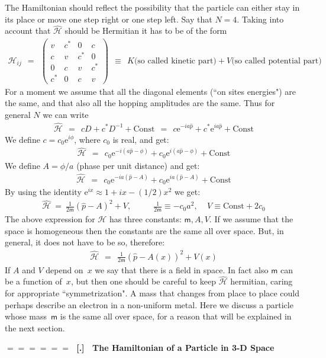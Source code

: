 \documentclass[onecolumn,fleqn]{revtex4}
\newcommand{\eexp}{\mathrm{e}^}
\newcommand{\mass}{\mathsf{m}}
\newcommand{\amatrix}[1]{\begin{matrix} #1 \end{matrix}}
\newcommand{\beq}{\begin{eqnarray}}
\newcommand{\eeq}{\end{eqnarray}}
\renewcommand{\thesubsection}{\arabic{subsection}}
\renewcommand{\thesubsubsection}{\arabic{subsubsection}}
\newcommand{\sheadC}[1]
{
\addtocounter{subsubsection}{1}
\vspace{5mm}
{\Large\bf $=\!=\!=\!=\!=\!=\;$ [\thesubsection.\thesubsubsection] \ #1}  
\nopagebreak
\phantomsection
}
\begin{document}
The Hamiltonian should reflect the possibility that 
the particle can either stay in its place or
move one step right or one step left. Say that $N=4$. 
Taking into account that $\hat{\mathcal{H}}$ should be Hermitian 
it has to be of the form
\beq
\mathcal{H}_{ij} \ \ = \ \ 
\left(\amatrix{
v   & c^* & 0   & c \\ 
c   & v   & c^* & 0 \\
0   & c   & v   & c^* \\
c^* & 0   & c   & v  
}\right)
\ \ \equiv \ \ K\mbox{(so called kinetic part)} + V\mbox{(so called potential part)}
\eeq
For a moment we assume that all the diagonal elements (``on sites energies") are the same, 
and that also all the hopping amplitudes are the same. Thus for general $N$ we can write      
\beq
\hat{\mathcal{H}} 
\ \ = \ \ cD + c^*D^{-1} + \mbox{Const} 
\ \ = \ \ c\mbox{e}^{-ia\hat{p}} + c^* \mbox{e}^{ia\hat{p}} + \mbox{Const} 
\eeq
We define ${c=c_0 \eexp{i\phi}}$, where $c_0$ is real, and get:
\beq
\hat{\mathcal{H}} \ \ = \ \ c_0 \mbox{e}^{-i(a\hat{p}-\phi)} + c_0 \mbox{e}^{i(a\hat{p}-\phi)} + \mbox{Const} 
\eeq
We define ${A= \phi / a}$ (phase per unit distance) and get:
\beq
\hat{\mathcal{H}} \ \ = \ \ c_0 \mbox{e}^{-ia(\hat{p}-A)} + c_0 \mbox{e}^{ia(\hat{p}-A)} + \mbox{Const} 
\eeq
By using the identity ${\mbox{e}^{ix} \approx 1 + ix - (1/2)x^2}$ we get:
\beq
\hat{\mathcal{H}} \ = \ \frac{1}{2\mass} (\hat{p}-A)^2 + V, 
\ \ \ \ \ \ \ \ \ \ \ \
\frac{1}{2\mass}\equiv-c_0a^2, 
\ \ \ \ \
V \equiv \mbox{Const}+2c_0
\eeq
The above expression for $\mathcal{H}$ has three constants: ${\mass, A, V}$. 
If we assume that the space is homogeneous then the constants 
are the same all over space. But, in general, it does not 
have to be so, therefore:
\beq
\hat{\mathcal{H}} \ \ = \ \ \frac{1}{2\mass} (\hat{p}-A(x))^2 + V(x) 
\eeq
If $A$ and $V$ depend on~$x$ we say that there is a field in space. 
In fact also $\mass$ can be a function of~$x$, but then one should be careful 
to keep $\hat{\mathcal{H}}$ hermitian, caring for appropriate ``symmetrization".  
A mass that changes from place to place could perhaps describe an electron 
in a non-uniform metal. Here we discuss a particle whose mass~$\mass$ 
is the same all over space, for a reason that will be explained in the next section.

 
\sheadC{The Hamiltonian of a Particle in 3-D Space} 
\end{document}
